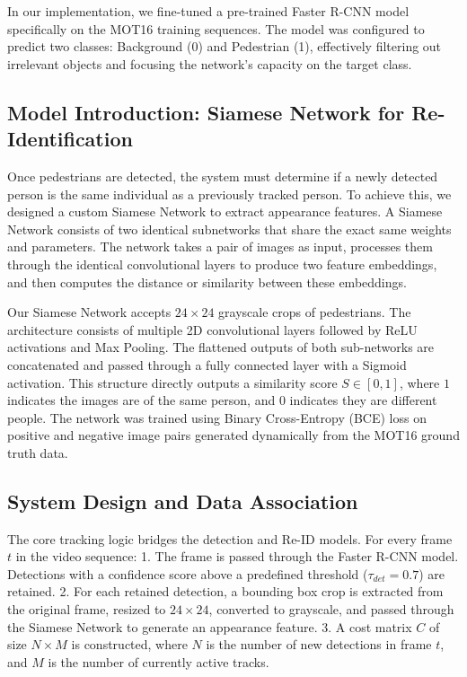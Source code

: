 \documentclass[11pt, letterpaper]{article}
\begin{document}
In our implementation, we fine-tuned a pre-trained Faster R-CNN model specifically on the MOT16 training sequences. The model was configured to predict two classes: Background (0) and Pedestrian (1), effectively filtering out irrelevant objects and focusing the network's capacity on the target class.

\subsection{Model Introduction: Siamese Network for Re-Identification}
Once pedestrians are detected, the system must determine if a newly detected person is the same individual as a previously tracked person. To achieve this, we designed a custom Siamese Network \cite{bromley1993signature} to extract appearance features.
A Siamese Network consists of two identical subnetworks that share the exact same weights and parameters. The network takes a pair of images as input, processes them through the identical convolutional layers to produce two feature embeddings, and then computes the distance or similarity between these embeddings.

Our Siamese Network accepts $24 \times 24$ grayscale crops of pedestrians. The architecture consists of multiple 2D convolutional layers followed by ReLU activations and Max Pooling. The flattened outputs of both sub-networks are concatenated and passed through a fully connected layer with a Sigmoid activation. This structure directly outputs a similarity score $S \in [0, 1]$, where $1$ indicates the images are of the same person, and $0$ indicates they are different people. The network was trained using Binary Cross-Entropy (BCE) loss on positive and negative image pairs generated dynamically from the MOT16 ground truth data.

\subsection{System Design and Data Association}
The core tracking logic bridges the detection and Re-ID models. For every frame $t$ in the video sequence:
1. The frame is passed through the Faster R-CNN model. Detections with a confidence score above a predefined threshold ($\tau_{det} = 0.7$) are retained.
2. For each retained detection, a bounding box crop is extracted from the original frame, resized to $24 \times 24$, converted to grayscale, and passed through the Siamese Network to generate an appearance feature.
3. A cost matrix $C$ of size $N \times M$ is constructed, where $N$ is the number of new detections in frame $t$, and $M$ is the number of currently active tracks. 
\end{document}
